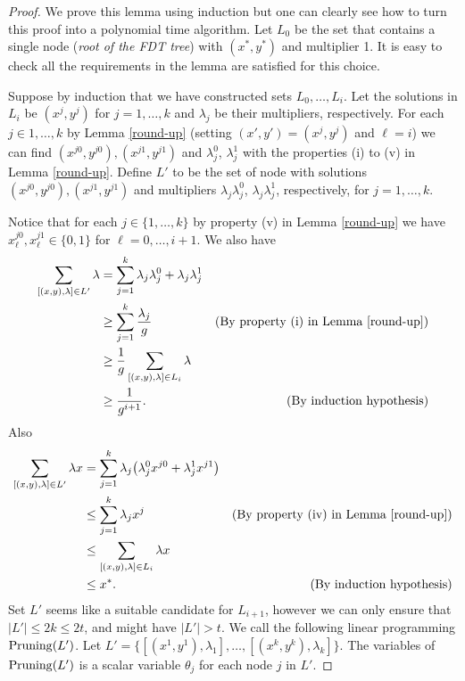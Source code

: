 \begin{proof}
	We prove this lemma using induction but one can clearly see how to turn this proof into a polynomial time algorithm. Let $L_0$ be the set that contains a single node (\textit{root of the FDT tree}) with $(x^*,y^*)$ and multiplier 1. It is easy to check all the requirements in the lemma are satisfied for this choice.
	
	Suppose by induction that we have constructed sets $L_0,\ldots,L_i$. Let the solutions in $L_i$ be $(x^j,y^j)$ for $j=1,\ldots,k$ and $\lambda_j$ be their multipliers, respectively. For each $j\in 1,\ldots,k$ by Lemma \ref{round-up} (setting $(x',y')= (x^j,y^j)$ and $\ell = i$) we can find $(x^{j0},y^{j0}), (x^{j1},y^{j1})$ and $\lambda^0_j$, $\lambda^1_j$ with the properties (i) to (v) in Lemma \ref{round-up}. Define $L'$ to be the set of node with solutions $(x^{j0},y^{j0}), (x^{j1},y^{j1})$ and multipliers  $\lambda_j\lambda^0_j$, $\lambda_j\lambda^1_j$, respectively, for $j=1,\ldots,k$.
	
	Notice that for each $j\in \{1,\ldots,k\}$ by property (v) in Lemma \ref{round-up} we have $x_\ell^{j0}, x_\ell^{j1}\in \{0,1\}$ for $\ell = 0,\ldots,i+1$. We also have
	\begin{align*}
	\sum_{[(x,y),\lambda]\in L'} \lambda & =  \sum_{j=1}^{k} \lambda_j\lambda^0_j+\lambda_j\lambda^1_j&\\
	& \geq \sum_{j=1}^{k} \frac{\lambda_j}{ g} & (\text{By property (i) in Lemma \ref{round-up}})\\
	& \geq \frac{1}{g} \sum_{[(x,y),\lambda]\in L_i}\lambda&\\
	 & \geq \frac{1}{g^{i+1}}.&(\text{By induction hypothesis})	 
	\end{align*} 
	Also 
	\begin{align*}
\sum_{[(x,y),\lambda]\in L'}\lambda x & =  \sum_{j=1}^{k} \lambda_j\big(\lambda^0_jx^{j0}+\lambda^1_jx^{j1}\big)&\\ 
& \leq \sum_{j=1}^{k} \lambda_j x^j  & (\text{By property (iv) in Lemma \ref{round-up}})\\
& \leq \sum_{[(x,y),\lambda]\in L_i}\lambda x&\\
& \leq x^*.&(\text{By induction hypothesis})	 
\end{align*} 
Set $L'$ seems like a suitable candidate for $L_{i+1}$, however we can only ensure that $|L'|\leq 2k\leq 2t$, and might have $|L'|>t$. We call the following linear programming $\operatorname{Pruning}(L')$. Let $L' = \{[(x^1,y^1),\lambda_1],\ldots,[(x^k,y^k),\lambda_k]\}$. The variables of $\operatorname{Pruning}(L')$ is a scalar variable $\theta_j$ for each node $j$ in $L'$.  


\end{proof}
